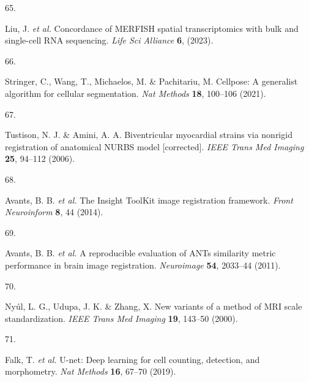 \documentclass[
  12pt,
]{article}
\newlength{\cslhangindent}
\newlength{\csllabelwidth}
\newenvironment{CSLReferences}[2] %
 {%
  \setlength{\parindent}{0pt}
  \ifodd #1 \everypar{\setlength{\hangindent}{\cslhangindent}}\ignorespaces\fi
  \ifnum #2 > 0
  \setlength{\parskip}{#2\baselineskip}
  \fi
 }%
 {}
\newcommand{\CSLLeftMargin}[1]{\parbox[t]{\csllabelwidth}{#1}}
\newcommand{\CSLRightInline}[1]{\parbox[t]{\linewidth - \csllabelwidth}{#1}\break}
\begin{document}
\begin{CSLReferences}{0}{0}
\leavevmode{}%
\CSLLeftMargin{65. }
\CSLRightInline{Liu, J. \emph{et al.} Concordance of MERFISH spatial
transcriptomics with bulk and single-cell RNA sequencing. \emph{Life Sci
Alliance} \textbf{6}, (2023).}

\leavevmode{}%
\CSLLeftMargin{66. }
\CSLRightInline{Stringer, C., Wang, T., Michaelos, M. \& Pachitariu, M.
Cellpose: A generalist algorithm for cellular segmentation. \emph{Nat
Methods} \textbf{18}, 100--106 (2021).}

\leavevmode{}%
\CSLLeftMargin{67. }
\CSLRightInline{Tustison, N. J. \& Amini, A. A. Biventricular myocardial
strains via nonrigid registration of anatomical {NURBS} model
{[}corrected{]}. \emph{IEEE Trans Med Imaging} \textbf{25}, 94--112
(2006).}

\leavevmode{}%
\CSLLeftMargin{68. }
\CSLRightInline{Avants, B. B. \emph{et al.} The {Insight} {ToolKit}
image registration framework. \emph{Front Neuroinform} \textbf{8}, 44
(2014).}

\leavevmode{}%
\CSLLeftMargin{69. }
\CSLRightInline{Avants, B. B. \emph{et al.} A reproducible evaluation of
ANTs similarity metric performance in brain image registration.
\emph{Neuroimage} \textbf{54}, 2033--44 (2011).}

\leavevmode{}%
\CSLLeftMargin{70. }
\CSLRightInline{Nyúl, L. G., Udupa, J. K. \& Zhang, X. New variants of a
method of MRI scale standardization. \emph{IEEE Trans Med Imaging}
\textbf{19}, 143--50 (2000).}

\leavevmode{}%
\CSLLeftMargin{71. }
\CSLRightInline{Falk, T. \emph{et al.} U-net: Deep learning for cell
counting, detection, and morphometry. \emph{Nat Methods} \textbf{16},
67--70 (2019).}

\end{CSLReferences}
\end{document}
